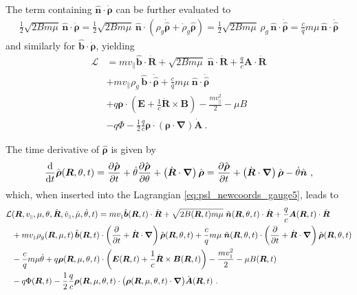 \documentclass{scrartcl}
\renewcommand{\vec}[1]{\boldsymbol{#1}}
\newcommand{\uv}[1]{\hat{\vec{#1}}}
\newcommand{\bnabla}{\vec{\nabla}}
\newcommand{\rvgc}{\vec{R}} %
\newcommand{\PSL}{\mathcal{L}}
\newcommand{\subparallel}{{\scriptscriptstyle\parallel}}
\begin{document}
The term containing $\uv{n}\cdot\dot{\vec{\rho}}$ can be further evaluated to
\begin{align*}
\frac12\sqrt{2Bm\mu}\,\uv{n}\cdot\dot{\vec{\rho}} = \frac12\sqrt{2Bm\mu}\,\uv{n}\cdot\left(\rho_g\dot{\uv{\rho}} + \dot{\rho}_g\uv{\rho}\right) = \frac12\sqrt{2Bm\mu}\,\rho_g\,\uv{n}\cdot\dot{\uv{\rho}} = \frac{c}{q}m\mu\,\uv{n}\cdot\dot{\uv{\rho}}
\end{align*}
and similarly for $\uv{b}\cdot\dot{\vec{\rho}}$, yielding
\begin{align}
\PSL &= mv_\subparallel \uv{b}\cdot\dot{\rvgc} + \sqrt{2Bm\mu}\;\uv{n}\cdot\dot{\rvgc} + \frac{q}{c}\vec{A}\cdot\dot{\rvgc} \nonumber\\
& + mv_\subparallel\rho_g\,\uv{b}\cdot\dot{\uv{\rho}} + \frac{c}{q}m\mu\;\uv{n}\cdot\dot{\uv{\rho}} \nonumber\\
& + q\vec{\rho}\cdot\left(\vec{E} + \frac{1}{c}\dot{\rvgc}\times\vec{B}\right) - \frac{m v_\subparallel^2}{2} - \mu B \nonumber\\
& - q\Phi - \frac12\frac{q}{c}\vec{\rho}\cdot(\vec{\rho}\cdot\bnabla)\dot{\vec{A}} \ . \label{eq:psl_newcoords_gauge5}
\end{align}

The time derivative of $\uv{\rho}$ is given by
\begin{equation*}
    \dv{t}\uv{\rho}(\rvgc,\theta,t) = \pdv{\uv{\rho}}{t} + \dot{\theta}\pdv{\uv{\rho}}{\theta} + \left(\dot{\rvgc}\cdot\bnabla\right)\uv{\rho} = \pdv{\uv{\rho}}{t} + \left(\dot{\rvgc}\cdot\bnabla\right)\uv{\rho} - \dot{\theta}\uv{n} \ ,
\end{equation*}
which, when inserted into the Lagrangian \eqref{eq:psl_newcoords_gauge5}, leads to
\begin{align}
\PSL&(\rvgc,v_\subparallel,\mu,\theta,\dot{\rvgc},\dot{v}_\subparallel,\dot{\mu},\dot{\theta},t) = mv_\subparallel \uv{b}(\rvgc,t)\cdot\dot{\rvgc} + \sqrt{2B(\rvgc,t)m\mu}\;\uv{n}(\rvgc,\theta,t)\cdot\dot{\rvgc} + \frac{q}{c}\vec{A}(\rvgc,t)\cdot\dot{\rvgc} \nonumber\\
& + mv_\subparallel\rho_g(\rvgc,\mu,t)\,\uv{b}(\rvgc,t)\cdot\left(\pdv{t} +  \dot{\rvgc}\cdot\bnabla\right)\uv{\rho}(\rvgc,\theta,t) + \frac{c}{q}m\mu\;\uv{n}(\rvgc,\theta,t)\cdot\left(\pdv{t} +  \dot{\rvgc}\cdot\bnabla\right)\uv{\rho}(\rvgc,\theta,t) \nonumber\\
& - \frac{c}{q}m\mu\dot{\theta} + q\vec{\rho}(\rvgc,\mu,\theta,t)\cdot\left(\vec{E}(\rvgc,t) + \frac{1}{c}\dot{\rvgc}\times\vec{B}(\rvgc,t)\right) - \frac{m v_\subparallel^2}{2} - \mu B(\rvgc,t) \nonumber\\
& - q\Phi(\rvgc,t) - \frac12\frac{q}{c}\vec{\rho}(\rvgc,\mu,\theta,t)\cdot\big(\vec{\rho}(\rvgc,\mu,\theta,t)\cdot\bnabla\big)\dot{\vec{A}}(\rvgc,t) \ . \label{eq:psl_newcoords_gauge6}
\end{align}
\end{document}
